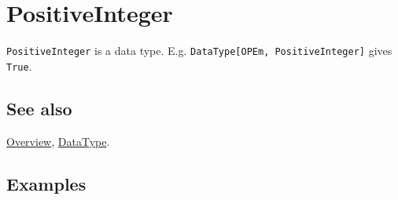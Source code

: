 \documentclass[../FeynCalcManual.tex]{subfiles}
\begin{document}
\hypertarget{positiveinteger}{%
\section{PositiveInteger}\label{positiveinteger}}

\texttt{PositiveInteger} is a data type. E.g.
\texttt{DataType[\allowbreak{}OPEm,\ \allowbreak{}PositiveInteger]}
gives \texttt{True}.

\subsection{See also}

\hyperlink{toc}{Overview}, \hyperlink{datatype}{DataType}.

\subsection{Examples}
\end{document}

